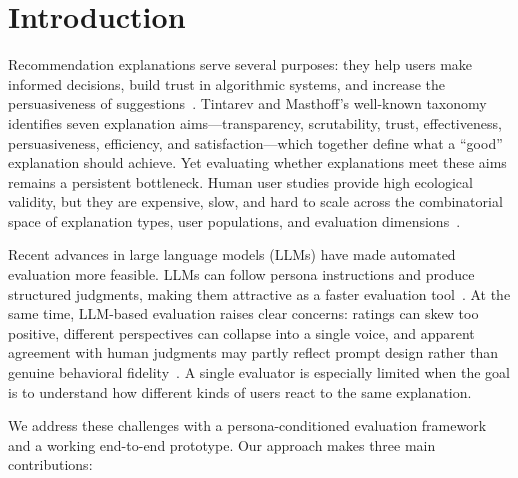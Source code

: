 \documentclass[sigconf,nonacm]{acmart}
\begin{document}


\maketitle

\section{Introduction}
\label{sec:introduction}

Recommendation explanations serve several purposes: they help users make informed decisions, build trust in algorithmic systems, and increase the persuasiveness of suggestions~\cite{tintarev2007survey}. Tintarev and Masthoff's well-known taxonomy identifies seven explanation aims---transparency, scrutability, trust, effectiveness, persuasiveness, efficiency, and satisfaction---which together define what a ``good'' explanation should achieve. Yet evaluating whether explanations meet these aims remains a persistent bottleneck. Human user studies provide high ecological validity, but they are expensive, slow, and hard to scale across the combinatorial space of explanation types, user populations, and evaluation dimensions~\cite{kouki2019}.

Recent advances in large language models (LLMs) have made automated evaluation more feasible. LLMs can follow persona instructions and produce structured judgments, making them attractive as a faster evaluation tool~\cite{argyle2023}. At the same time, LLM-based evaluation raises clear concerns: ratings can skew too positive, different perspectives can collapse into a single voice, and apparent agreement with human judgments may partly reflect prompt design rather than genuine behavioral fidelity~\cite{zheng2023judging}. A single evaluator is especially limited when the goal is to understand how different kinds of users react to the same explanation.

We address these challenges with a persona-conditioned evaluation framework and a working end-to-end prototype. Our approach makes three main contributions:
\end{document}
